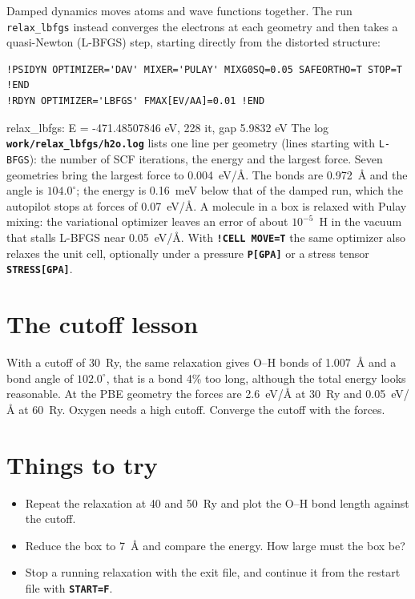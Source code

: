 \documentclass[11pt,a4paper,oneside]{book}
\newcommand{\key}[1]{\textbf{\texttt{#1}}}
\newcommand{\file}[1]{\textbf{\texttt{#1}}}
\newenvironment{shell}{\small\verbatim}{\endverbatim}
\begin{document}
Damped dynamics moves atoms and wave functions together. The run
\texttt{relax\_lbfgs} instead converges the electrons at each geometry
and then takes a quasi-Newton (L-BFGS) step, starting directly from the
distorted structure:
\begin{verbatim}
!PSIDYN OPTIMIZER='DAV' MIXER='PULAY' MIXG0SQ=0.05 SAFEORTHO=T STOP=T !END
!RDYN OPTIMIZER='LBFGS' FMAX[EV/AA]=0.01 !END
\end{verbatim}
\begin{shell}
    relax_lbfgs: E = -471.48507846 eV, 228 it, gap 5.9832 eV
\end{shell}
The log \file{work/relax\_lbfgs/h2o.log} lists one line per geometry
(lines starting with \texttt{L-BFGS}): the number of SCF iterations, the
energy and the largest force. Seven geometries bring the largest force
to 0.004~eV/\AA. The bonds are 0.972~\AA{} and the angle is
$104.0^\circ$; the energy is 0.16~meV below that of the damped run,
which the autopilot stops at forces of 0.07~eV/\AA. A molecule in a box
is relaxed with Pulay mixing: the variational optimizer leaves an error
of about $10^{-5}$~H in the vacuum that stalls L-BFGS near
0.05~eV/\AA. With \key{!CELL MOVE=T} the same optimizer also relaxes
the unit cell, optionally under a pressure \key{P[GPA]} or a stress
tensor \key{STRESS[GPA]}.

\section{The cutoff lesson}

With a cutoff of 30~Ry, the same relaxation gives O--H bonds of
1.007~\AA{} and a bond angle of $102.0^\circ$, that is a bond 4\% too
long, although the total energy looks reasonable. At the PBE geometry
the forces are 2.6~eV/\AA{} at 30~Ry and 0.05~eV/\AA{} at 60~Ry. Oxygen
needs a high cutoff. Converge the cutoff with the forces.

\section{Things to try}
\begin{itemize}
\item Repeat the relaxation at 40 and 50~Ry and plot the O--H bond
  length against the cutoff.
\item Reduce the box to 7~\AA{} and compare the energy. How large must
  the box be?
\item Stop a running relaxation with the exit file, and continue it
  from the restart file with \key{START=F}.
\end{itemize}
\end{document}
